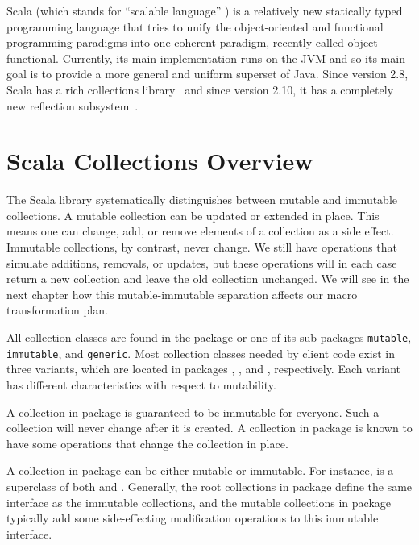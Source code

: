 \label{background}

Scala (which stands for ``scalable language'' \cite{odersky:PiS})  is a relatively new statically typed programming language
that tries to unify the object-oriented and functional programming paradigms
into one coherent paradigm, recently called object-functional. Currently, its
main implementation runs on the JVM and so its main goal is to provide a more
general and uniform superset of Java. Since version 2.8, Scala has a rich
collections library~\cite[Chapter~24]{odersky:PiS} and since version 2.10, it has a completely new reflection subsystem~\cite{scaladocs:refl}.

\section{Scala Collections Overview}

The Scala library systematically distinguishes between mutable and immutable
collections. A mutable collection can be updated or extended in place. This
means one can change, add, or remove elements of a collection as a side effect.
Immutable collections, by contrast, never change. We still have operations
that simulate additions, removals, or updates, but these operations will in each
case return a new collection and leave the old collection unchanged. We will see
in the next chapter how this mutable-immutable separation affects our macro
transformation plan.

All collection classes are found in the package  or one of its
sub-packages \texttt{mutable}, \texttt{immutable}, and \texttt{generic}. Most collection
classes needed by client code exist in three variants, which are located in packages
, , and ,
respectively. Each variant has different characteristics with respect to
mutability.

A collection in package  is guaranteed to be immutable
for everyone. Such a collection will never change after it is created. A collection in package  is known to have some operations that change the collection in place.

A collection in package  can be either mutable or immutable. For
instance,  is a superclass of both
 and .
Generally, the root collections in package  define the same
interface as the immutable collections, and the mutable collections in package
 typically add some side-effecting modification
operations to this immutable interface.

